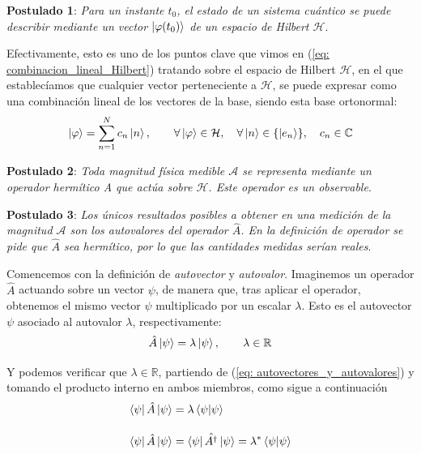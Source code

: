 \documentclass{article}
\numberwithin{equation}{section} %
\begin{document}
    \textbf{Postulado 1}: \textit{Para un instante \( t_{0} \), el estado de un sistema cuántico se puede describir mediante un vector \( \ket{\varphi(t_{0})} \) de un espacio de Hilbert \( \mathcal{H} \)}.

    \vspace{2.5mm}

    Efectivamente, esto es uno de los puntos clave que vimos en (\ref{eq: combinacion_lineal_Hilbert}) tratando sobre el espacio de Hilbert \( \mathcal{H}\), en el que establecíamos que cualquier vector perteneciente a \( \mathcal{H} \), se puede expresar como una combinación lineal de los vectores de la base, siendo esta base ortonormal:
    \begin{equation*}
        \ket{\varphi} = \sum_{n = 1}^{N} c_{n} \ket{n}, \qquad \forall \ket{\varphi} \in \mathcal{H}, \quad \forall \ket{n} \in \{ \ket{e_{n}} \}, \quad c_{n} \in \mathbb{C}
    \end{equation*}

    \vspace{5mm}

    \textbf{Postulado 2}: \textit{Toda magnitud física medible \( \mathcal{A} \) se representa mediante un operador
    hermítico A que actúa sobre \( \mathcal{H} \). Este operador es un observable}.
    
    \vspace{5mm}

    \textbf{Postulado 3}: \textit{Los únicos resultados posibles a obtener en una medición de la
    magnitud \( \mathcal{A}\) son los autovalores del operador \( \hat{A} \). En la definición de operador se
    pide que \( \hat{A} \) sea hermítico, por lo que las cantidades medidas serían reales}.
    
    \vspace{2.5mm}

    Comencemos con la definición de \textit{autovector} y \textit{autovalor}. Imaginemos un operador \( \hat{A} \) actuando sobre un vector \( \psi \), de manera que, tras aplicar el operador, obtenemos el mismo vector \( \psi \) multiplicado por un escalar \( \lambda \). Esto es el autovector \( \psi \) asociado al autovalor \( \lambda \), respectivamente:
    \begin{equation}
        \hat{A} \ket{\psi} = \lambda \ket{\psi}, \qquad \lambda \in \mathbb{R}
        \label{eq: autovectores_y_autovalores}
    \end{equation}

    Y podemos verificar que \( \lambda \in \mathbb{R} \), partiendo de (\ref{eq: autovectores_y_autovalores}) y tomando el producto interno en ambos miembros, como sigue a continuación
    \begin{align*}
        \bra{\psi} \hat{A} \ket{\psi} &= \lambda \braket{\psi | \psi} \\[10pt]
        \bra{\psi} \hat{A} \ket{\psi} &= \bra{\psi} {\hat{A ^ {\dagger}}} \ket{\psi} = \lambda ^ {*} \braket{\psi | \psi} 
    \end{align*}
\end{document}

